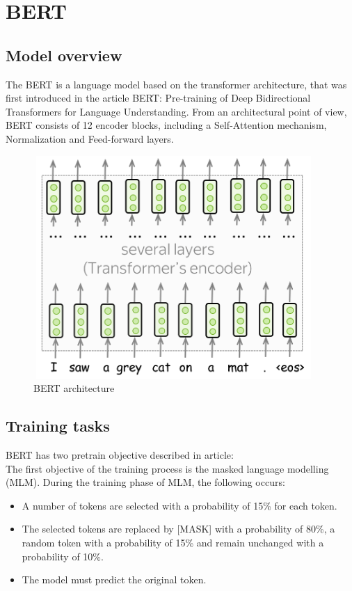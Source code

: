 \documentclass[PMI,VKR]{HSEUniversity}
\begin{document}
\section{BERT}
\subsection{Model overview}

The BERT is a language model based on the transformer architecture, that was first introduced in the article BERT: Pre-training of Deep Bidirectional Transformers for Language Understanding\cite{bert:2018}.  
From an architectural point of view, BERT consists of 12 encoder blocks, including a Self-Attention mechanism, Normalization and Feed-forward layers.

\begin{figure}[h]
    \centering
    \includegraphics[scale=0.8]{img/bert.png}
    \caption{BERT architecture}
\end{figure}


\subsection{Training tasks}
BERT has two pretrain objective described in article: \\
The first objective of the training process is the masked language modelling (MLM). 
During the training phase of MLM, the following occurs:

\begin{itemize}
    \item A number of tokens are selected with a probability of 15\% for each token.
    \item The selected tokens are replaced by [MASK] with a probability of 80\%, a random token with a probability of 15\% and remain unchanged with a probability of 10\%.
    \item The model must predict the original token.
\end{itemize}
\end{document}
